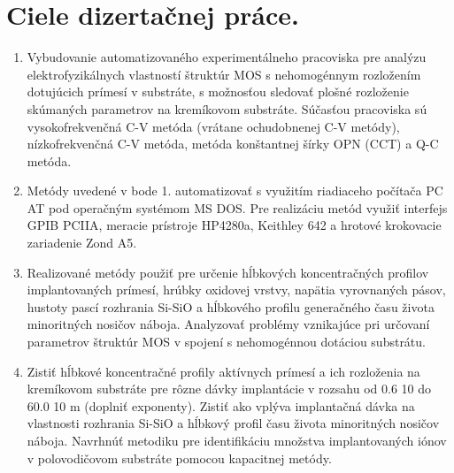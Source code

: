 
\chapter{Ciele dizertačnej práce.} %

\label{Chapter2} %


\begin{enumerate}
\item Vybudovanie automatizovaného experimentálneho pracoviska pre
  analýzu elektrofyzikálnych vlastností štruktúr MOS s nehomogénnym
  rozložením dotujúcich prímesí v substráte, s možnosťou sledovať
  plošné rozloženie skúmaných parametrov na kremíkovom substráte.
  Súčasťou pracoviska sú vysokofrekvenčná C-V metóda (vrátane
  ochudobnenej C-V metódy), nízkofrekvenčná C-V metóda, metóda
  konštantnej šírky OPN (CCT) a Q-C metóda.
\item Metódy uvedené v bode 1. automatizovať s využitím riadiaceho
  počítača PC AT pod operačným systémom MS DOS.  Pre realizáciu
  metód využiť interfejs GPIB PCIIA, meracie prístroje HP4280a,
  Keithley 642 a hrotové krokovacie zariadenie Zond A5.
\item Realizované metódy použiť pre určenie hĺbkových koncentračných
  profilov implantovaných prímesí, hrúbky oxidovej vrstvy, napätia
  vyrovnaných pásov, hustoty pascí rozhrania Si-SiO a hĺbkového
  profilu generačného času života minoritných nosičov náboja.
  Analyzovať problémy vznikajúce pri určovaní parametrov štruktúr MOS
  v spojení s nehomogénnou dotáciou substrátu.
\item Zistiť hĺbkové koncentračné profily aktívnych prímesí a ich
  rozloženia na kremíkovom substráte pre rôzne dávky implantácie v
  rozsahu od 0.6 10 do 60.0 10 m (doplniť exponenty). Zistiť ako
  vplýva implantačná dávka na vlastnosti rozhrania Si-SiO a hĺbkový
  profil času života minoritných nosičov náboja.  Navrhnúť metodiku
  pre identifikáciu množstva implantovaných iónov v polovodičovom
  substráte pomocou kapacitnej metódy.
\end{enumerate}
